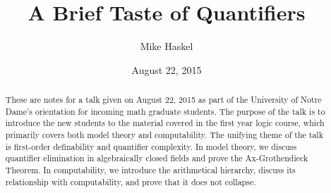\documentclass{article}
\title{A Brief Taste of Quantifiers}
\author{Mike Haskel}
\date{August 22, 2015}
\theoremstyle{plain}
\theoremstyle{definition}
\begin{document}
\maketitle

\begin{abstract}
  These are notes for a talk given on August 22, 2015 as part of the
  University of Notre Dame's orientation for incoming math graduate
  students. The purpose of the talk is to introduce the new students
  to the material covered in the first year logic course, which
  primarily covers both model theory and computability. The unifying
  theme of the talk is first-order definability and quantifier
  complexity. In model theory, we discuss quantifier elimination in
  algebraically closed fields and prove the Ax-Grothendieck
  Theorem. In computability, we introduce the arithmetical hierarchy,
  discuss its relationship with computability, and prove that it does
  not collapse.
\end{abstract}
\end{document}
